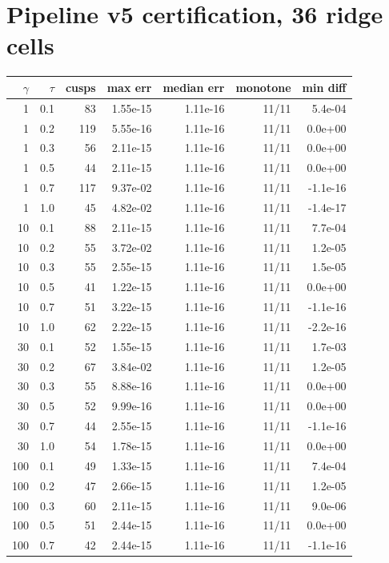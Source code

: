 \section{Pipeline v5 certification, 36 ridge cells}
{\small\begin{longtable}{rrrrrrr}
\toprule
$\gamma$ & $\tau$ & cusps & max err & median err & monotone & min diff \\
\midrule
\endhead
1 & 0.1 & 83 & 1.55e-15 & 1.11e-16 & 11/11 & 5.4e-04 \\
1 & 0.2 & 119 & 5.55e-16 & 1.11e-16 & 11/11 & 0.0e+00 \\
1 & 0.3 & 56 & 2.11e-15 & 1.11e-16 & 11/11 & 0.0e+00 \\
1 & 0.5 & 44 & 2.11e-15 & 1.11e-16 & 11/11 & 0.0e+00 \\
1 & 0.7 & 117 & 9.37e-02 & 1.11e-16 & 11/11 & -1.1e-16 \\
1 & 1.0 & 45 & 4.82e-02 & 1.11e-16 & 11/11 & -1.4e-17 \\
10 & 0.1 & 88 & 2.11e-15 & 1.11e-16 & 11/11 & 7.7e-04 \\
10 & 0.2 & 55 & 3.72e-02 & 1.11e-16 & 11/11 & 1.2e-05 \\
10 & 0.3 & 55 & 2.55e-15 & 1.11e-16 & 11/11 & 1.5e-05 \\
10 & 0.5 & 41 & 1.22e-15 & 1.11e-16 & 11/11 & 0.0e+00 \\
10 & 0.7 & 51 & 3.22e-15 & 1.11e-16 & 11/11 & -1.1e-16 \\
10 & 1.0 & 62 & 2.22e-15 & 1.11e-16 & 11/11 & -2.2e-16 \\
30 & 0.1 & 52 & 1.55e-15 & 1.11e-16 & 11/11 & 1.7e-03 \\
30 & 0.2 & 67 & 3.84e-02 & 1.11e-16 & 11/11 & 1.2e-05 \\
30 & 0.3 & 55 & 8.88e-16 & 1.11e-16 & 11/11 & 0.0e+00 \\
30 & 0.5 & 52 & 9.99e-16 & 1.11e-16 & 11/11 & 0.0e+00 \\
30 & 0.7 & 44 & 2.55e-15 & 1.11e-16 & 11/11 & -1.1e-16 \\
30 & 1.0 & 54 & 1.78e-15 & 1.11e-16 & 11/11 & 0.0e+00 \\
100 & 0.1 & 49 & 1.33e-15 & 1.11e-16 & 11/11 & 7.4e-04 \\
100 & 0.2 & 47 & 2.66e-15 & 1.11e-16 & 11/11 & 1.2e-05 \\
100 & 0.3 & 60 & 2.11e-15 & 1.11e-16 & 11/11 & 9.0e-06 \\
100 & 0.5 & 51 & 2.44e-15 & 1.11e-16 & 11/11 & 0.0e+00 \\
100 & 0.7 & 42 & 2.44e-15 & 1.11e-16 & 11/11 & -1.1e-16 \\

\end{longtable}}
